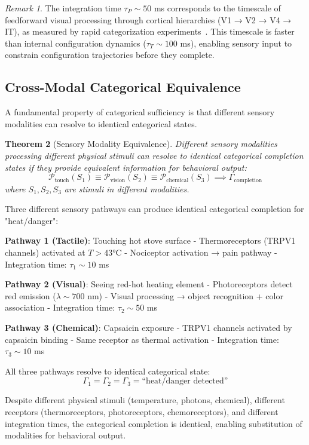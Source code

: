 \documentclass[aps,prd,twocolumn,superscriptaddress,floatfix,nofootinbib]{revtex4-2}
\newtheorem{theorem}{Theorem}[section]
\theoremstyle{remark}
\newtheorem{remark}[theorem]{Remark}
\begin{document}
\begin{remark}
The integration time $\tau_P \sim 50$ ms corresponds to the timescale of feedforward visual processing through cortical hierarchies (V1 → V2 → V4 → IT), as measured by rapid categorization experiments~\cite{thorpe1996speed}. This timescale is faster than internal configuration dynamics ($\tau_T \sim 100$ ms), enabling sensory input to constrain configuration trajectories before they complete.
\end{remark}

\subsection{Cross-Modal Categorical Equivalence}

A fundamental property of categorical sufficiency is that different sensory modalities can resolve to identical categorical states.

\begin{theorem}[Sensory Modality Equivalence]
\label{thm:modality_equiv}
Different sensory modalities processing different physical stimuli can resolve to identical categorical completion states if they provide equivalent information for behavioral output:
\begin{equation}
\mathcal{P}_{\text{touch}}(S_1) \equiv \mathcal{P}_{\text{vision}}(S_2) \equiv \mathcal{P}_{\text{chemical}}(S_3) \implies \Gamma_{\text{completion}}
\end{equation}
where $S_1, S_2, S_3$ are stimuli in different modalities.
\end{theorem}

\begin{example}
\label{ex:heat}
Three different sensory pathways can produce identical categorical completion for "heat/danger":

\textbf{Pathway 1 (Tactile)}: Touching hot stove surface
- Thermoreceptors (TRPV1 channels) activated at $T > 43°$C
- Nociceptor activation → pain pathway
- Integration time: $\tau_1 \sim 10$ ms

\textbf{Pathway 2 (Visual)}: Seeing red-hot heating element
- Photoreceptors detect red emission ($\lambda \sim 700$ nm)
- Visual processing → object recognition + color association
- Integration time: $\tau_2 \sim 50$ ms

\textbf{Pathway 3 (Chemical)}: Capsaicin exposure
- TRPV1 channels activated by capsaicin binding
- Same receptor as thermal activation
- Integration time: $\tau_3 \sim 10$ ms

All three pathways resolve to identical categorical state:
$$
\Gamma_1 = \Gamma_2 = \Gamma_3 = \text{``heat/danger detected''}
$$

Despite different physical stimuli (temperature, photons, chemical), different receptors (thermoreceptors, photoreceptors, chemoreceptors), and different integration times, the categorical completion is identical, enabling substitution of modalities for behavioral output.
\end{example}
\end{document}

